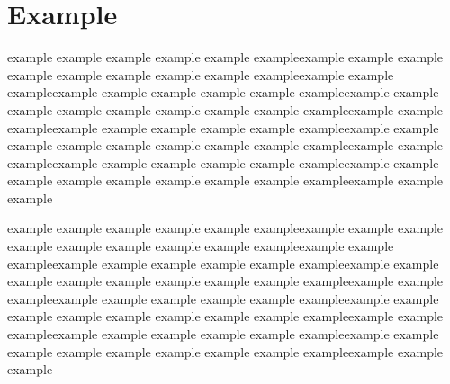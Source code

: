 \section{Example}
example example example example example exampleexample example example\newline
example example example example example exampleexample example example\newline example example example example example exampleexample example example\newline
example example example example example exampleexample example example\newline example example example example example exampleexample example example\newline
example example example example example exampleexample example example\newline example example example example example exampleexample example example\newline
example example example example example exampleexample example example\newline

\newpage
example example example example example exampleexample example example\newline
example example example example example exampleexample example example\newline example example example example example exampleexample example example\newline
example example example example example exampleexample example example\newline example example example example example exampleexample example example\newline
example example example example example exampleexample example example\newline example example example example example exampleexample example example\newline
example example example example example exampleexample example example\newline
